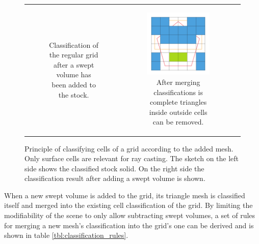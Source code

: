 \begin{figure}[h]
\begin{tabular}{ccc}
\begin{subfigure}[t]{0.3\textwidth}
			\caption{Classification of the regular grid after a swept volume has been added to the stock.}
			\label{fig:classification_after}
		\end{subfigure}&
		\begin{subfigure}[t]{0.3\textwidth}
			\centering
			\includegraphics[width=\textwidth]{images/classification_after_removal}
			\caption{After merging classifications is complete triangles inside outside cells can be removed.}
			\label{fig:classification_after_removal}
		\end{subfigure}&\\
	\end{tabular}
	\caption{Principle of classifying cells of a grid according to the added mesh. Only surface cells are relevant for ray casting. The sketch on the left side shows the classified stock solid. On the right side the classification result after adding a swept volume is shown.}
	\label{fig:classification}
\end{figure}

When a new swept volume is added to the grid, its triangle mesh is classified itself and merged into the existing cell classification of the grid.
By limiting the modifiability of the scene to only allow subtracting swept volumes, a set of rules for merging a new mesh's classification into the grid's one can be derived and is shown in table \ref{tbl:classification_rules}.

